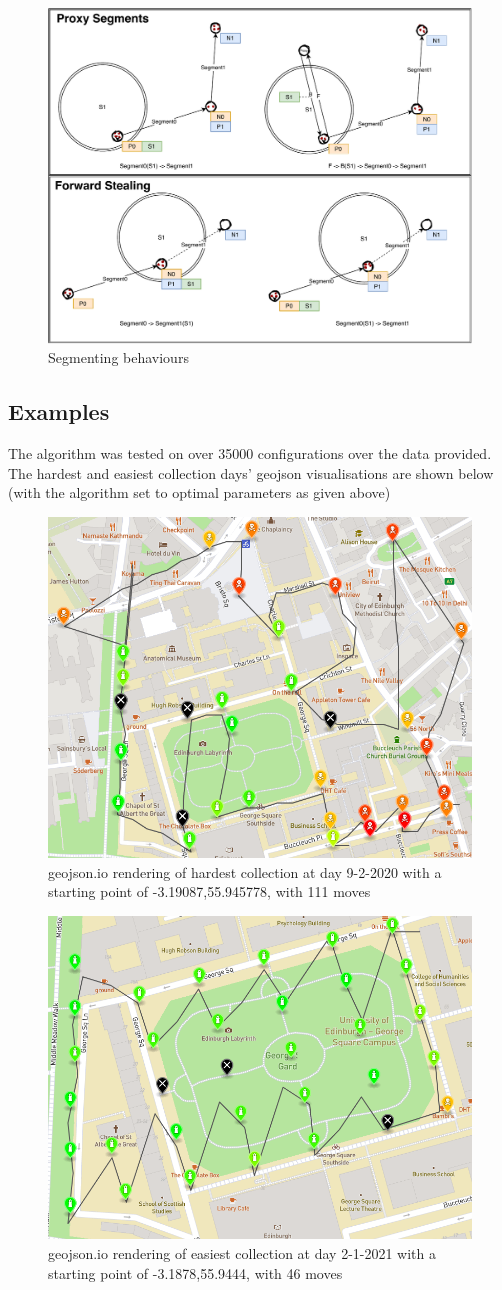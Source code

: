 \documentclass[10pt,a4paper]{article}
\begin{document}
\begin{figure}[H]
    \centering
    \includegraphics[width=0.7\columnwidth]{diagrams/diagram.pdf}
    \caption{Segmenting behaviours}
    \label{fig:segmenting}
\end{figure}

\subsection{Examples}
The algorithm was tested on over 35000 configurations over the data provided. 
The hardest and easiest collection days' geojson visualisations are shown below (with the algorithm set to optimal parameters as given above) 
\begin{figure}[H]
    \centering
    \includegraphics[width=0.4\columnwidth]{diagrams/hard-day.png}
    \caption{geojson.io rendering of hardest collection at day 9-2-2020 with a starting point of -3.19087,55.945778, with 111 moves}
    \label{fig:hardmap}
\end{figure}
\begin{figure}[H]
    \centering
    \includegraphics[width=0.4\columnwidth]{diagrams/easy-day.png}
    \caption{geojson.io rendering of easiest collection at day 2-1-2021 with a starting point of -3.1878,55.9444, with 46 moves}
    \label{fig:easymap}
\end{figure}
\end{document}
